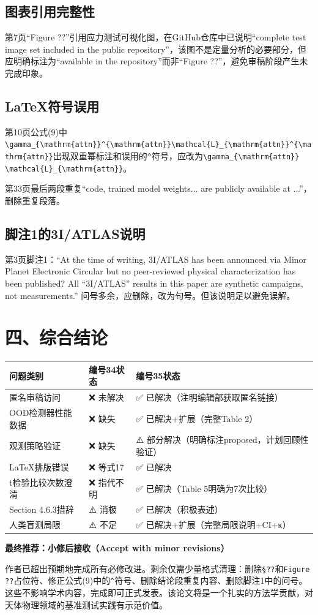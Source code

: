 \documentclass[12pt]{article}
\begin{document}
\subsection{图表引用完整性}

第7页“Figure ??”引用应力测试可视化图，在GitHub仓库中已说明“complete test image set included in the public repository”，该图不是定量分析的必要部分，但应明确标注为“available in the repository”而非“Figure ??”，避免审稿阶段产生未完成印象。

\subsection{LaTeX符号误用}

第10页公式(9)中\texttt{\textbackslash gamma\_\{\textbackslash mathrm\{attn\}\}\textasciicircum\{\textbackslash mathrm\{attn\}\}\textbackslash mathcal\{L\}\_\{\textbackslash mathrm\{attn\}\}\textasciicircum\{\textbackslash mathrm\{attn\}\}}出现双重幂标注和误用的\texttt{\textasciicircum}符号，应改为\texttt{\textbackslash gamma\_\{\textbackslash mathrm\{attn\}\} \textbackslash mathcal\{L\}\_\{\textbackslash mathrm\{attn\}\}}。

第33页最后两段重复“code, trained model weights... are publicly available at ...”，删除重复段落。

\subsection{脚注1的3I/ATLAS说明}

第3页脚注1：“At the time of writing, 3I/ATLAS has been announced via Minor Planet Electronic Circular but no peer-reviewed physical characterization has been published? All ``3I/ATLAS'' results in this paper are synthetic campaigns, not measurements.” 问号多余，应删除，改为句号。但该说明足以避免误解。

\section{四、综合结论}

\begin{tabular}{|p{4cm}|p{2.5cm}|p{6.5cm}|}
\hline
\textbf{问题类别} & \textbf{编号34状态} & \textbf{编号35状态} \\
\hline
匿名审稿访问 & ❌ 未解决 & ✅ 已解决（注明编辑部获取匿名链接） \\
\hline
OOD检测器性能数据 & ❌ 缺失 & ✅ 已解决+扩展（完整Table 2） \\
\hline
观测策略验证 & ❌ 缺失 & ⚠️ 部分解决（明确标注proposed，计划回顾性验证） \\
\hline
LaTeX排版错误 & ❌ 等式17 & ✅ 已解决 \\
\hline
t检验比较次数澄清 & ❌ 指代不明 & ✅ 已解决（Table 5明确为7次比较） \\
\hline
Section 4.6.3措辞 & ⚠️ 消极 & ✅ 已解决（积极表述） \\
\hline
人类盲测局限 & ⚠️ 不足 & ✅ 已解决+扩展（完整局限说明+CI+κ） \\
\hline
\end{tabular}

\textbf{最终推荐：小修后接收（Accept with minor revisions）}

作者已超出预期地完成所有必修改进。剩余仅需少量格式清理：删除\texttt{\S ??}和\texttt{Figure ??}占位符、修正公式(9)中的\texttt{\textasciicircum}符号、删除结论段重复内容、删除脚注1中的问号。这些不影响学术内容，完成即可正式发表。该论文将是一个扎实的方法学贡献，对天体物理领域的基准测试实践有示范价值。
\end{document}
